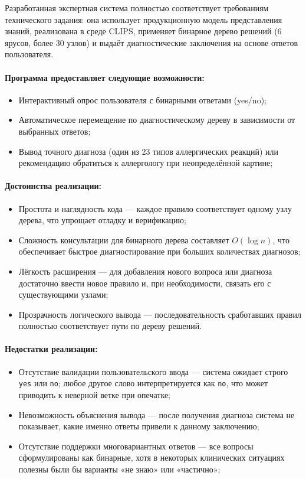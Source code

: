 \documentclass[a4paper, final]{extarticle}
\begin{document}
	Разработанная экспертная система полностью соответствует требованиям технического задания: она использует продукционную модель представления знаний, реализована в среде CLIPS, применяет бинарное дерево решений (6 ярусов, более 30 узлов) и выдаёт диагностические заключения на основе ответов пользователя.
	
	\paragraph{Программа предоставляет следующие возможности:}
	\begin{itemize}
		\item Интерактивный опрос пользователя с бинарными ответами (yes/no);
		\item Автоматическое перемещение по диагностическому дереву в зависимости от выбранных ответов;
		\item Вывод точного диагноза (один из 23 типов аллергических реакций) или рекомендацию обратиться к аллергологу при неопределённой картине;
	\end{itemize}
	
	\paragraph{Достоинства реализации:}
	\begin{itemize}
		\item Простота и наглядность кода — каждое правило соответствует одному узлу дерева, что упрощает отладку и верификацию;
		\item Сложность консультации для бинарного дерева составляет $O(\log n)$, что обеспечивает быстрое диагностирование при больших количествах диагнозов;
		\item Лёгкость расширения — для добавления нового вопроса или диагноза достаточно ввести новое правило и, при необходимости, связать его с существующими узлами;
		\item Прозрачность логического вывода — последовательность сработавших правил полностью соответствует пути по дереву решений.
	\end{itemize}
	
	\paragraph{Недостатки реализации:}
	\begin{itemize}
		\item Отсутствие валидации пользовательского ввода — система ожидает строго \texttt{yes} или \texttt{no}; любое другое слово интерпретируется как \texttt{no}, что может приводить к неверной ветке при опечатке;
		\item Невозможность объяснения вывода — после получения диагноза система не показывает, какие именно ответы привели к данному заключению;
		\item Отсутствие поддержки многовариантных ответов — все вопросы сформулированы как бинарные, хотя в некоторых клинических ситуациях полезны были бы варианты «не знаю» или «частично»;
	\end{itemize}
	
\end{document}
